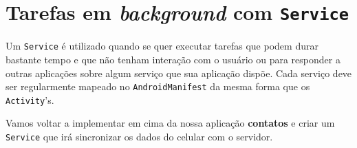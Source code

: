 \section{Tarefas em \emph{background} com \texttt{Service}}

Um \texttt{Service} é utilizado quando se quer executar tarefas que
podem durar bastante tempo e que não tenham interação com o usuário ou
para responder a outras aplicações sobre algum serviço que sua aplicação
dispõe. Cada serviço deve ser regularmente mapeado no
\texttt{AndroidManifest} da mesma forma que os \texttt{Activity}'s.

Vamos voltar a implementar em cima da nossa aplicação \textbf{contatos}
e criar um \texttt{Service} que irá sincronizar os dados do celular com
o servidor.
